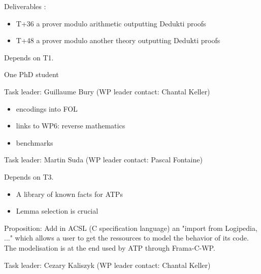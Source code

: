 \begin{workpackage}[id=atpetc,wphases=0-48,type=RTD,
  short=ATPs etc.,%
  title={ATP, SAT, SMT, Model checkers},
  lead=Lie,
  LieRM=10]
\begin{tasklist}
\begin{task}[id=tracetodedukti, title=Translate ATP traces into Dedukti]
\begin{compactenum}
  Deliverables :
  \begin{itemize}
  \item T+36 a prover modulo arithmetic outputting Dedukti proofs
  \item T+48 a prover modulo another theory outputting Dedukti proofs
  \end{itemize}

\end{compactenum}
  Depends on T1.

  One PhD student
  
\end{task}


\begin{task}[id=deduktitoatp, title=Translate Dedukti statements into ATPs inputs]
  Task leader: Guillaume Bury (WP leader contact: Chantal Keller)
  
\begin{itemize}
\item encodings into FOL
\item links to WP6: reverse mathematics
\item benchmarks
\end{itemize}

\end{task}


\begin{task}[id=library, title=Logipedia as a source of knowledge for ATP]
  Task leader: Martin Suda (WP leader contact: Pascal Fontaine)

  
Depends on T3.

\begin{itemize}
\item A library of known facts for ATPs
\item Lemma selection is crucial
\end{itemize}

Proposition: Add in ACSL (C specification language) an "import from
Logipedia, ..." which allows a user to get the ressources to model the
behavior of its code. The modelisation is at the end used by ATP through
Frama-C-WP.

\end{task}


\begin{task}[id=reconstruction, title=ATPs for Logipedia]
  Task leader: Cezary Kaliszyk (WP leader contact: Chantal Keller)


\end{task}
\end{tasklist}
\end{workpackage}

